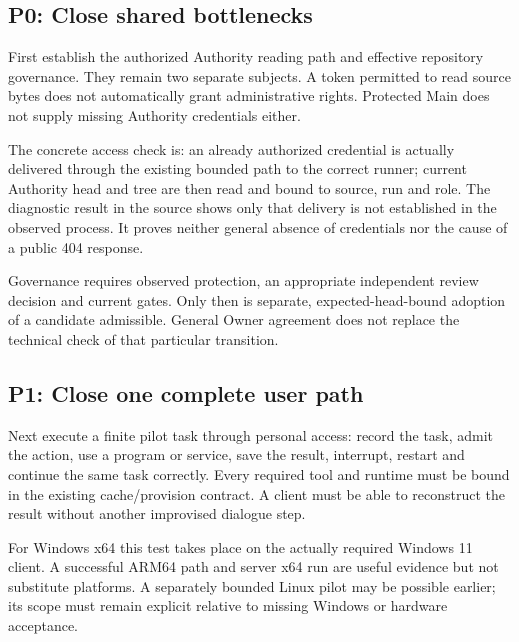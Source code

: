 \begin{cols}
\subsection*{P0: Close shared bottlenecks}
First establish the authorized Authority reading path and effective repository governance. They remain two separate subjects. A token permitted to read source bytes does not automatically grant administrative rights. Protected Main does not supply missing Authority credentials either.

The concrete access check is: an already authorized credential is actually delivered through the existing bounded path to the correct runner; current Authority head and tree are then read and bound to source, run and role. The diagnostic result in the source shows only that delivery is not established in the observed process. It proves neither general absence of credentials nor the cause of a public 404 response. 

Governance requires observed protection, an appropriate independent review decision and current gates. Only then is separate, expected-head-bound adoption of a candidate admissible. General Owner agreement does not replace the technical check of that particular transition. 

\subsection*{P1: Close one complete user path}
Next execute a finite pilot task through personal access: record the task, admit the action, use a program or service, save the result, interrupt, restart and continue the same task correctly. Every required tool and runtime must be bound in the existing cache/provision contract. A client must be able to reconstruct the result without another improvised dialogue step. 

For Windows x64 this test takes place on the actually required Windows 11 client. A successful ARM64 path and server x64 run are useful evidence but not substitute platforms. A separately bounded Linux pilot may be possible earlier; its scope must remain explicit relative to missing Windows or hardware acceptance. 


\end{cols}
